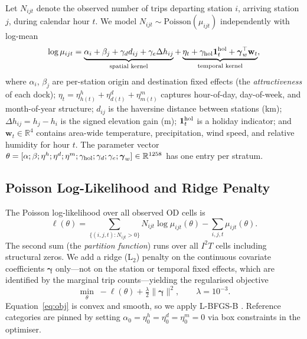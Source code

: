 \documentclass[conference,10pt]{IEEEtran}
\begin{document}
Let $N_{ijt}$ denote the observed number of trips departing station $i$,
arriving station $j$, during calendar hour $t$.  We model
$N_{ijt}\!\sim\!\text{Poisson}(\mu_{ijt})$ independently with
log-mean
\begin{equation}
  \log\mu_{ijt} = \underbrace{\alpha_i + \beta_j +
      \gamma_d d_{ij} + \gamma_e \Delta h_{ij}}_{\text{spatial kernel}}
    + \underbrace{\eta_t + \gamma_{\rm hol}\mathbf{1}_t^{\rm hol}
      + \boldsymbol{\gamma}_w^\top \mathbf{w}_t}_{\text{temporal kernel}},
  \label{eq:logmu}
\end{equation}
where
$\alpha_i$, $\beta_j$ are per-station origin and destination fixed
effects (the \emph{attractiveness} of each dock);
$\eta_t = \eta^h_{h(t)} + \eta^d_{d(t)} + \eta^m_{m(t)}$ captures
hour-of-day, day-of-week, and month-of-year structure;
$d_{ij}$ is the haversine distance between stations (km);
$\Delta h_{ij} = h_j - h_i$ is the signed elevation gain (m);
$\mathbf{1}_t^{\rm hol}$ is a holiday indicator; and
$\mathbf{w}_t\!\in\!\mathbb{R}^4$ contains area-wide temperature,
precipitation, wind speed, and relative humidity for hour $t$.
The parameter vector
$\theta = [\alpha;\beta;\eta^h;\eta^d;\eta^m;\gamma_{\rm hol};
\gamma_d;\gamma_e;\boldsymbol\gamma_w]
\in\mathbb{R}^{1258}$ has one entry per stratum.

\subsection{Poisson Log-Likelihood and Ridge Penalty}

The Poisson log-likelihood over all observed OD cells is
\[
  \ell(\theta)
  = \sum_{\{(i,j,t):N_{ijt}>0\}} N_{ijt}\log\mu_{ijt}(\theta)
    - \sum_{i,j,t}\mu_{ijt}(\theta).
\]
The second sum (the \emph{partition function}) runs over all $I^2 T$
cells including structural zeros.  We add a ridge (L$_2$) penalty on
the continuous covariate coefficients $\boldsymbol{\gamma}$ only---not
on the station or temporal fixed effects, which are identified by the
marginal trip counts---yielding the regularised objective
\begin{equation}
  \min_\theta\;-\ell(\theta) +
      \tfrac{\lambda}{2}\|\boldsymbol{\gamma}\|^2, \qquad \lambda=10^{-3}.
  \label{eq:obj}
\end{equation}
Equation~\eqref{eq:obj} is convex and smooth, so we apply L-BFGS-B
\cite{Kochenderfer2022}.  Reference categories are pinned by setting
$\alpha_0 = \eta^h_0 = \eta^d_0 = \eta^m_0 = 0$ via box constraints
in the optimiser.
\end{document}
